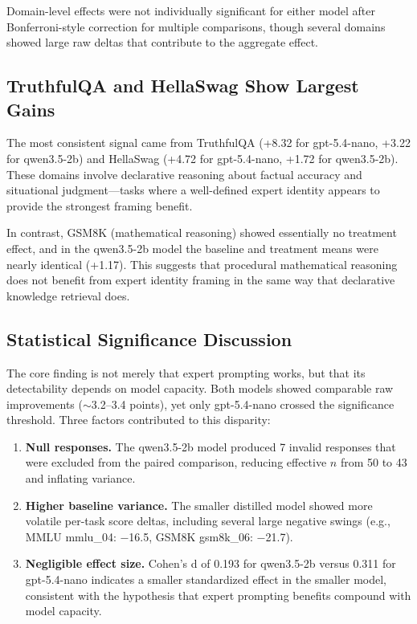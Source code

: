 \documentclass[anonymous, submission, paper]{iclr2026}
\begin{document}
Domain-level effects were not individually significant for either model after Bonferroni-style correction for multiple comparisons, though several domains showed large raw deltas that contribute to the aggregate effect.

\subsection{TruthfulQA and HellaSwag Show Largest Gains}
\label{sec:largest_gains}

The most consistent signal came from TruthfulQA (+8.32 for gpt-5.4-nano, +3.22 for qwen3.5-2b) and HellaSwag (+4.72 for gpt-5.4-nano, +1.72 for qwen3.5-2b). These domains involve declarative reasoning about factual accuracy and situational judgment---tasks where a well-defined expert identity appears to provide the strongest framing benefit.

In contrast, GSM8K (mathematical reasoning) showed essentially no treatment effect, and in the qwen3.5-2b model the baseline and treatment means were nearly identical (+1.17). This suggests that procedural mathematical reasoning does not benefit from expert identity framing in the same way that declarative knowledge retrieval does.

\subsection{Statistical Significance Discussion}
\label{sec:significance_discussion}

The core finding is not merely that expert prompting works, but that its detectability depends on model capacity. Both models showed comparable raw improvements ($\sim$3.2--3.4 points), yet only gpt-5.4-nano crossed the significance threshold. Three factors contributed to this disparity:

\begin{enumerate}
  \item \textbf{Null responses.} The qwen3.5-2b model produced 7 invalid responses that were excluded from the paired comparison, reducing effective $n$ from 50 to 43 and inflating variance.

  \item \textbf{Higher baseline variance.} The smaller distilled model showed more volatile per-task score deltas, including several large negative swings (e.g., MMLU mmlu\_04: $-$16.5, GSM8K gsm8k\_06: $-$21.7).

  \item \textbf{Negligible effect size.} Cohen's d of 0.193 for qwen3.5-2b versus 0.311 for gpt-5.4-nano indicates a smaller standardized effect in the smaller model, consistent with the hypothesis that expert prompting benefits compound with model capacity.
\end{enumerate}
\end{document}
